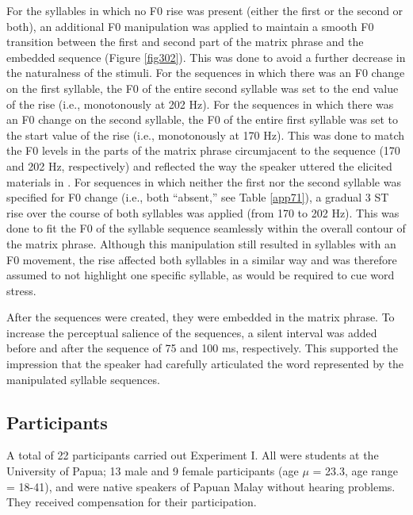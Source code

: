 For the syllables in which no F0 rise was present (either the first or the second or both), an additional F0 manipulation was applied to maintain a smooth F0 transition between the first and second part of the matrix phrase and the embedded sequence (Figure \ref{fig302}). This was done to avoid a further decrease in the naturalness of the stimuli. For the sequences in which there was an F0 change on the first syllable, the F0 of the entire second syllable was set to the end value of the rise (i.e., monotonously at 202 Hz). For the sequences in which there was an F0 change on the second syllable, the F0 of the entire first syllable was set to the start value of the rise (i.e., monotonously at 170 Hz). This was done to match the F0 levels in the parts of the matrix phrase circumjacent to the sequence (170 and 202 Hz, respectively) and reflected the way the speaker uttered the elicited materials in \citet{kluge_grammar_2017}. For sequences in which neither the first nor the second syllable was specified for F0 change (i.e., both ``absent,'' see Table \ref{app71}), a gradual 3 ST rise over the course of both syllables was applied (from 170 to 202 Hz). This was done to fit the F0 of the syllable sequence seamlessly within the overall contour of the matrix phrase. Although this manipulation still resulted in syllables with an F0 movement, the rise affected both syllables in a similar way and was therefore assumed to not highlight one specific syllable, as would be required to cue word stress.

After the sequences were created, they were embedded in the matrix phrase. To increase the perceptual salience of the sequences, a silent interval was added before and after the sequence of 75 and 100 ms, respectively. This supported the impression that the speaker had carefully articulated the word represented by the manipulated syllable sequences.

\subsection{Participants}
A total of 22 participants carried out Experiment I. All were students at the University of Papua; 13 male and 9 female participants (age $\mu$ = 23.3, age range = 18-41), and were native speakers of Papuan Malay without hearing problems. They received compensation for their participation.

